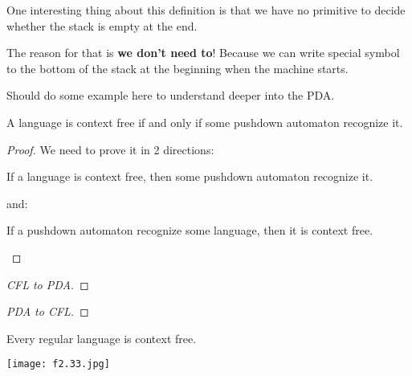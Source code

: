 One interesting thing about this definition is that we have no primitive to decide whether the stack is empty at the end.

The reason for that is \textbf{we don't need to}! Because we can write special symbol to the bottom of the stack at the beginning when the machine starts.

\begin{remark}
    Should do some example here to understand deeper into the PDA.   
\end{remark}

\begin{theorem}
    A language is context free if and only if some pushdown automaton recognize it.
\end{theorem}
\begin{proof}
    We need to prove it in 2 directions:
    \begin{lemma}\label{lemma: 4-1}
        If a language is context free, then some pushdown automaton recognize it.
    \end{lemma}
    and:
    \begin{lemma}\label{lemma: 4-2}
        If a pushdown automaton recognize some language, then it is context free.
    \end{lemma}
\end{proof}
\begin{proof}[CFL to PDA]
    
\end{proof}
\begin{proof}[PDA to CFL]
    
\end{proof}

\begin{corollary}
    Every regular language is context free.

    \centering 
    \texttt{[image: f2.33.jpg]}
\end{corollary}
